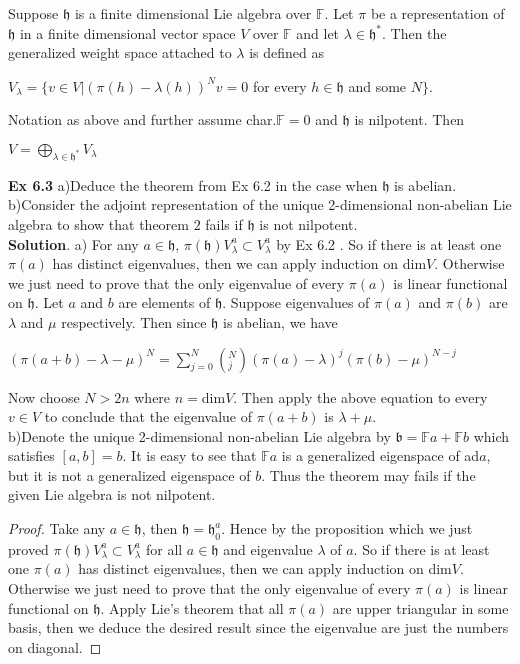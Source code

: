 \documentclass[12pt,a4paper]{article}
\begin{document}
\noindent Suppose $\mathfrak{h}$ is a finite dimensional Lie
algebra over $\mathbb{F}$. Let $\pi$ be a representation of
$\mathfrak{h}$ in a finite dimensional vector space $V$ over
$\mathbb{F}$ and let $\lambda\in\mathfrak{h}^{*}$. Then the
generalized weight space attached to $\lambda$ is defined as
\begin{center}
$V_{\lambda}=\{v\in V|(\pi(h)-\lambda(h))^{N}v=0$ for every
$h\in\mathfrak{h}$ and some $N\}$.
\end{center}
\begin{theorem} Notation as above and further assume
char.$\mathbb{F}=0$ and $\mathfrak{h}$ is nilpotent. Then
\begin{center}
$V=\bigoplus_{\lambda\in\mathfrak{h}^{*}}V_{\lambda}$
\end{center}
\end{theorem}
\textbf{Ex 6.3} a)Deduce the theorem from Ex 6.2 in the case
when
$\mathfrak{h}$ is abelian.\\
b)Consider the adjoint representation of the unique 2-dimensional
non-abelian Lie algebra to show that theorem $2$ fails if
$\mathfrak{h}$ is not nilpotent.\\
\textbf{Solution}. a) For any $a\in\mathfrak{h}$,
$\pi(\mathfrak{h})V_{\lambda}^{a} \subset V_{\lambda}^{a}$ by Ex
6.2 . So if there is at least one $\pi(a)$ has distinct
eigenvalues, then we can apply induction on dim$V$. Otherwise we
just need to prove that the only eigenvalue of every $\pi(a)$ is
linear functional on $\mathfrak{h}$. Let $a$ and $b$ are elements
of $\mathfrak{h}$. Suppose eigenvalues of $\pi(a)$ and $\pi(b)$
are $\lambda$ and $\mu$ respectively. Then since $\mathfrak{h}$ is
abelian, we have
\begin{center}
$(\pi(a+b)-\lambda-\mu)^{N}=\sum_{j=0}^{N}(^{N}_{j})(\pi(a)-\lambda)^{j}(\pi(b)-\mu)^{N-j}$
\end{center}
Now choose $N> 2n$ where $n=$dim$V$. Then apply the above equation
to every $v\in V$ to conclude that the eigenvalue of $\pi(a+b)$ is
$\lambda+\mu$.\\
b)Denote the unique 2-dimensional non-abelian Lie algebra by
$\mathfrak{b}=\mathbb{F}a+\mathbb{F}b$ which satisfies $[a,b]=b$.
It is easy to see that $\mathbb{F}a$ is a generalized eigenspace
of ad$a$, but it is not a generalized eigenspace of $b$. Thus the
theorem may fails if the given Lie algebra is not nilpotent.
\begin{proof}Take any $a\in\mathfrak{h}$, then $\mathfrak{h}=\mathfrak{h}^{a}_{0}$.
Hence by the proposition which we just proved
$\pi(\mathfrak{h})V_{\lambda}^{a} \subset V_{\lambda}^{a}$ for all
$a\in\mathfrak{h}$ and eigenvalue $\lambda$ of $a$. So if there is
at least one $\pi(a)$ has distinct eigenvalues, then we can apply
induction on dim$V$. Otherwise we just need to prove that the only
eigenvalue of every $\pi(a)$ is linear functional on
$\mathfrak{h}$. Apply Lie's theorem that all $\pi(a)$ are upper
triangular in some basis, then we deduce the desired result since
the eigenvalue are just the numbers on diagonal.
\end{proof}
\end{document}
